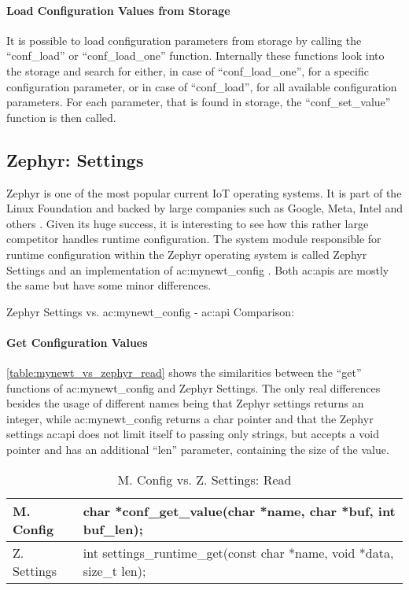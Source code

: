 \paragraph*{Load Configuration Values from Storage}\mbox{}

It is possible to load configuration parameters from storage by calling the ``conf\_load'' or ``conf\_load\_one'' function.
Internally these functions look into the storage and search for either, in case of ``conf\_load\_one'', for a specific configuration parameter, or in case of ``conf\_load'', for all available configuration parameters.
For each parameter, that is found in storage, the ``conf\_set\_value'' function is then called.

\subsection{Zephyr: Settings}

Zephyr is one of the most popular current IoT operating systems.
It is part of the Linux Foundation and backed by large companies such as Google, Meta, Intel and others \cite{zephyr-20}.
Given its huge success, it is interesting to see how this rather large competitor handles runtime configuration.
The system module responsible for runtime configuration within the Zephyr operating system is called Zephyr Settings \cite{zephyr_settings_pull_request} and an implementation of \gls{ac:mynewt_config} \cite{apache-mynewt-20}.
Both \glspl{ac:api} are mostly the same but have some minor differences.

Zephyr Settings vs. \gls{ac:mynewt_config} - \gls{ac:api} Comparison:

\paragraph*{Get Configuration Values}\mbox{}

\autoref{table:mynewt_vs_zephyr_read} shows the similarities between the ``get'' functions of \gls{ac:mynewt_config} and Zephyr Settings.
The only real differences besides the usage of different names being that Zephyr settings returns an integer, while \gls{ac:mynewt_config} returns a char pointer and that the Zephyr settings \gls{ac:api} does not limit itself to passing only strings, but accepts a void pointer and has an additional ``len'' parameter, containing the size of the value.

\begin{table}[H]
      \begin{tabular}{ | l | l | }
            \hline
            M. Config   & char *conf\_get\_value(char *name, char *buf, int buf\_len);
            \\ \hline
            Z. Settings & int settings\_runtime\_get(const char *name, void *data, size\_t len);
            \\
            \hline
      \end{tabular}
      \caption{M. Config vs. Z. Settings: Read}
      \label{table:mynewt_vs_zephyr_read}
\end{table}

